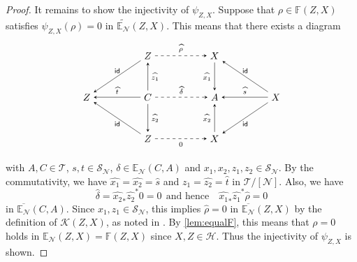 \documentclass[a4paper,reqno,10pt]{amsart}
\theoremstyle{definition}
\theoremstyle{definition}
\theoremstyle{definition}
\theoremstyle{definition}
\theoremstyle{plain}
\newcommand{\id}{\mathsf{id}}
\newcommand{\BE}{\mathbb{E}}
\newcommand{\BF}{\mathbb{F}}
\newcommand{\CH}{\mathcal{H}}
\newcommand{\CK}{\mathcal{K}}
\newcommand{\CN}{\mathcal{N}}
\newcommand{\CT}{\mathcal{T}}
\renewcommand{\SS}{\mathscr{S}}
\begin{document}
\begin{proof}
It remains to show the injectivity of $\psi_{Z,X}$. 
\color{blue}
Suppose that $\rho\in\BF(Z,X)$ satisfies
$\psi_{Z,X}(\rho)=0$ in $\widetilde{\BE_{\CN}}(Z,X)$.
This means that there exists a diagram
\[
\begin{tikzpicture}[>=stealth]
\node (1) at (-1.2,0) {$C$};
\node (2) at (-1.2,1.5) {$Z$};
\node (3) at (-1.2,-1.5) {$Z$};
\node (4) at (-3.4,0) {$Z$};
\node (5) at (3.4,0) {$X$};
\node (6) at (1.2,1.5) {$X$};
\node (7) at (1.2,-1.5) {$X$};
\node (8) at (1.2,0) {$A$};
\draw[->] (1) -- node[right,font=\scriptsize] {$\widehat{z_1}$} (2);
\draw[->] (1) -- node[right,font=\scriptsize] {$\widehat{z_2}$} (3);
\draw[->] (1) -- node[above,font=\scriptsize] {$\widehat{t}$} (4);
\draw[->] (2) -- node[above,font=\scriptsize] {$\id$} (4);
\draw[->] (3) -- node[below,font=\scriptsize] {$\id$} (4);
\draw[->, dashed] (2) -- node[above,font=\scriptsize] {$\widehat{\rho}$} (6);
\draw[->, dashed] (3) -- node[below,font=\scriptsize] {$0$} (7);
\draw[->, dashed] (1) -- node[above,font=\scriptsize] {$\widehat{\delta}$} (8);
\draw[->] (5) -- node[above,font=\scriptsize] {$\id$} (6);
\draw[->] (5) -- node[below,font=\scriptsize] {$\id$} (7);
\draw[->] (5) -- node[above,font=\scriptsize] {$\widehat{s}$} (8);
\draw[->] (6) -- node[left,font=\scriptsize] {$\widehat{x_1}$} (8);
\draw[->] (7) -- node[left,font=\scriptsize] {$\widehat{x_2}$} (8);
\end{tikzpicture}
\]
with $A,C\in\CT$, $s,t\in\SS_{\CN}$, $\delta\in\BE_{\CN}(C,A)$ and $x_1,x_2,z_1,z_2\in\SS_{\CN}$.
By the commutativity, we have $\widehat{x_1}=\widehat{x_2}=\widehat{s}$ and $\widehat{z_1}=\widehat{z_2}=\widehat{t}$ in $\CT/[\CN]$. Also, we have
\[ \widehat{\delta}=\widehat{x_2}_{\ast}\widehat{z_2}^{\ast}0=0 
\ \  \text{and hence}\quad
\widehat{x_1}_{\ast}\widehat{z_1}^{\ast}\widehat{\rho}=0
\]
in $\overline{\BE_{\CN}}(C,A)$. Since $x_1,z_1\in\SS_{\CN}$, this implies $\widehat{\rho}=0$ in $\overline{\BE_{\CN}}(Z,X)$ by the definition of $\CK(Z,X)$, as noted in \cite[Remark~3.17]{NOS22}.
By \cref{lem:equalF}, this means that $\rho=0$ holds in $\BE_{\CN}(Z,X)=\BF(Z,X)$ since $X,Z\in\CH$. Thus the injectivity of $\psi_{Z,X}$ is shown. 


\normalcolor
\end{proof}
\normalcolor
\end{document}
